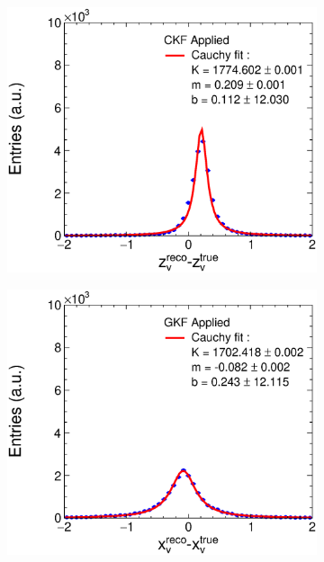 \begin{figure}[t]
\begin{subfigure}{0.32\textwidth}
         \caption{}
         \label{fig:VertYCKF_Integration}
     \end{subfigure}
    \begin{subfigure}{0.32\textwidth}
         \centering
         \includegraphics[width=\textwidth]{figures/ch5-KF_NDGAr/FullSample/Integration/ResZCKF.eps}
         \caption{}
         \label{fig:VertZCKF_Integration}
     \end{subfigure}
          \begin{subfigure}{0.32\textwidth}
         \centering
         \includegraphics[width=\textwidth]{figures/ch5-KF_NDGAr/FullSample/Integration/ResXGKF.eps}

\end{subfigure}
\end{figure}
